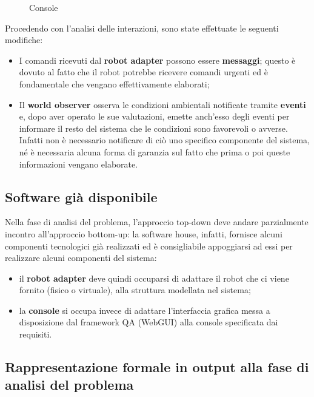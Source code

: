 \begin{figure}[H]
  \centering
  \caption{Console}%
  \label{fig:sp1:prob:console}
\end{figure}

Procedendo con l'analisi delle interazioni, sono state effettuate le seguenti modifiche:
\begin{itemize}
    \item
      I comandi ricevuti dal \textbf{robot adapter} possono essere \textbf{messaggi};
      questo è dovuto al fatto che il robot potrebbe ricevere comandi urgenti ed è fondamentale che vengano effettivamente elaborati;
    \item
      Il \textbf{world observer} osserva le condizioni ambientali notificate tramite \textbf{eventi} e,
      dopo aver operato le sue valutazioni, emette anch'esso degli eventi per informare il resto del sistema che le condizioni sono favorevoli o avverse.
      Infatti non è necessario notificare di ciò uno specifico componente del sistema, né è necessaria alcuna forma di garanzia sul fatto che prima o poi queste informazioni vengano elaborate.
\end{itemize}

\subsection{Software già disponibile}

Nella fase di analisi del problema, l'approccio top-down deve andare parzialmente incontro all'approccio bottom-up:
la software house, infatti, fornisce alcuni componenti tecnologici già realizzati ed è consigliabile appoggiarsi ad essi per realizzare alcuni componenti del sistema:

\begin{itemize}
    \item il \textbf{robot adapter} deve quindi occuparsi di adattare il robot che ci viene fornito (fisico o virtuale), alla struttura modellata nel sistema;
    \item la \textbf{console} si occupa invece di adattare l'interfaccia grafica messa a disposizione dal framework QA (WebGUI) alla console specificata dai requisiti.
\end{itemize}

\subsection[Rappresentazione formale]{Rappresentazione formale in output alla fase di analisi del problema}

